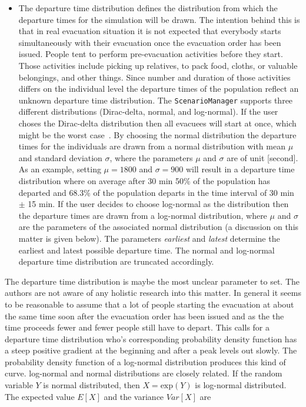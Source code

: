 \begin{itemize}
\item The departure time distribution defines the distribution from which the departure times for the simulation will be drawn. The intention behind this is that in real evacuation situation it is not expected that everybody starts simultaneously with their evacuation once the evacuation order has been issued. People tent to perform pre-evacuation activities before they start. Those activities include picking up relatives, to pack food, cloths, or valuable belongings, and other things. Since number and duration of those activities differs on the individual level the departure times of the population reflect an unknown departure time distribution. The \verb+ScenarioManager+ supports three different distributions (Dirac-delta, normal, and log-normal). If the user choses the Dirac-delta distribution then all evacuees will start at once, which might be the worst case~\citep{LaemmelKluepfel2012InfluenceOfDepartureTimeDistribution}. By choosing the normal distribution the departure times for the individuals are drawn from a normal distribution with mean $\mu$ and standard deviation $\sigma$, where the parameters $\mu$ and $\sigma$ are of unit [second]. As an example, setting $\mu = 1800$ and $\sigma =  900$ will result in a departure time distribution where on average after 30 min 50\% of the population has departed and 68.3\% of the population departs in the time interval of 30 min $\pm$ 15 min. If the user decides to choose log-normal as the distribution then the departure times are drawn from a log-normal distribution, where $\mu$ and $\sigma$ are the parameters of the associated normal distribution (a discussion on this matter is given below). The parameters \emph{earliest} and \emph{latest} determine the earliest and latest possible departure time. The normal and log-normal departure time distribution are truncated accordingly.
\end{itemize}
The departure time distribution is maybe the most unclear parameter to set. The authors are not aware of any holistic research into this matter. In general it seems to be reasonable to assume that a lot of people starting the evacuation at about the same time soon after the evacuation order has been issued and as the the time proceeds fewer and fewer people still have to depart. This calls for a departure time distribution who's corresponding probability density function has a steep positive gradient at the beginning and after a peak levels out slowly. The probability density function of a log-normal distribution produces this kind of curve. log-normal and normal distributions are closely related. If the random variable $Y$ is normal distributed, then $X = \text{exp}(Y)$ is log-normal distributed. The expected value $E[X]$  and the variance $Var[X]$ are
